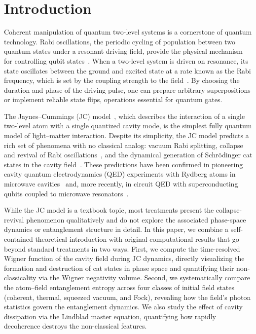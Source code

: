 \documentclass[%
 reprint,
 amsmath,amssymb,
 aps,
]{revtex4-2}
\begin{document}
\section{Introduction}
\label{sec:intro}

Coherent manipulation of quantum two-level systems is a cornerstone of quantum technology. Rabi oscillations, the periodic cycling of population between two quantum states under a resonant driving field, provide the physical mechanism for controlling qubit states~\cite{rabi1937, scully1997}. When a two-level system is driven on resonance, its state oscillates between the ground and excited state at a rate known as the Rabi frequency, which is set by the coupling strength to the field~\cite{allen1975, gerry2004}. By choosing the duration and phase of the driving pulse, one can prepare arbitrary superpositions or implement reliable state flips, operations essential for quantum gates.

The Jaynes--Cummings (JC) model~\cite{jaynes1963}, which describes the interaction of a single two-level atom with a single quantized cavity mode, is the simplest fully quantum model of light--matter interaction. Despite its simplicity, the JC model predicts a rich set of phenomena with no classical analog: vacuum Rabi splitting, collapse and revival of Rabi oscillations~\cite{eberly1980}, and the dynamical generation of Schr\"{o}dinger cat states in the cavity field~\cite{brune1996}. These predictions have been confirmed in pioneering cavity quantum electrodynamics (QED) experiments with Rydberg atoms in microwave cavities~\cite{rempe1987, haroche2006} and, more recently, in circuit QED with superconducting qubits coupled to microwave resonators~\cite{blais2021}.

While the JC model is a textbook topic, most treatments present the collapse-revival phenomenon qualitatively and do not explore the associated phase-space dynamics or entanglement structure in detail. In this paper, we combine a self-contained theoretical introduction with original computational results that go beyond standard treatments in two ways. First, we compute the time-resolved Wigner function of the cavity field during JC dynamics, directly visualizing the formation and destruction of cat states in phase space and quantifying their non-classicality via the Wigner negativity volume. Second, we systematically compare the atom--field entanglement entropy across four classes of initial field states (coherent, thermal, squeezed vacuum, and Fock), revealing how the field's photon statistics govern the entanglement dynamics. We also study the effect of cavity dissipation via the Lindblad master equation, quantifying how rapidly decoherence destroys the non-classical features.
\end{document}
